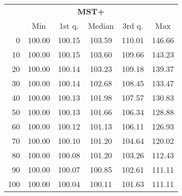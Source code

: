 \begin{tabular}{r|ccccc}
  \multicolumn{6}{c}{{\bf MST+}} \\
  & Min & 1st q. & Median & 3rd q. & Max \\ \hline\hline
  0 & 100.00 & 100.15 & 103.59 & 110.01 & 146.66
\\ 10 & 100.00 & 100.15 & 103.60 & 109.66 & 143.23
\\ 20 & 100.00 & 100.14 & 103.23 & 109.18 & 139.37
\\ 30 & 100.00 & 100.14 & 102.68 & 108.45 & 133.47
\\ 40 & 100.00 & 100.13 & 101.98 & 107.57 & 130.83
\\ 50 & 100.00 & 100.13 & 101.66 & 106.34 & 128.88
\\ 60 & 100.00 & 100.12 & 101.13 & 106.11 & 126.93
\\ 70 & 100.00 & 100.10 & 101.20 & 104.64 & 120.02
\\ 80 & 100.00 & 100.08 & 101.20 & 103.26 & 112.43
\\ 90 & 100.00 & 100.07 & 100.85 & 102.61 & 111.11
\\ 100 & 100.00 & 100.04 & 100.11 & 101.63 & 111.11
\end{tabular}
